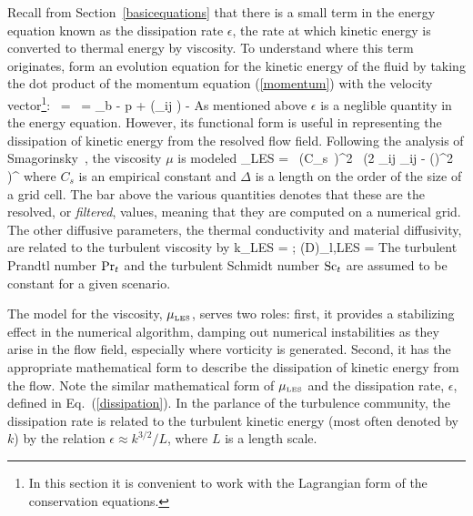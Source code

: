 \documentclass[11pt]{book}
\begin{document}
Recall from Section~\ref{basicequations} that there is a small term in the energy equation
known as the dissipation rate $\epsilon$,
the rate at which kinetic energy is converted to thermal energy by viscosity.
To understand where this term originates, form an evolution equation for the kinetic energy of the fluid by
taking the dot product of the momentum equation (\ref{momentum}) with the velocity vector\footnote{In this section
it is convenient to work with the Lagrangian form of the conservation equations. }:
\be \rho \,  \cdot \bu = \rho  \,  = \rho \bof_b \cdot \bu -
\nabla p \cdot \bu + \nabla \cdot (\btau_{ij} \cdot \bu) - \epsilon \ee
As mentioned above $\epsilon$ is a neglible quantity in the energy equation. However, its functional form
is useful in representing the dissipation of kinetic energy from the resolved flow field.
Following the analysis of Smagorinsky~\cite{Smagorinsky:1}, the viscosity $\mu$ is modeled
\be \mu_{\hbox{\tiny LES}} = \rho \, (C_s\, \Delta)^2 \,
   \left(2 \; \overline{\bS}_{ij} \cdot \overline{\bS}_{ij} -  (\nabla \cdot \overline{\bu})^2 \right)^\ha \ee
where $C_s$ is an empirical constant and $\Delta$ is a length on the
order of the size of a grid cell.
The bar above the various quantities denotes that these are the resolved, or {\em filtered}, values, meaning
that they are computed on a numerical grid.
The other diffusive parameters,
the thermal conductivity and material diffusivity, are related to the turbulent viscosity by
\be k_{\hbox{\tiny LES}} = 
\quad ; \quad
 (\rho D)_{l,\hbox{\tiny LES}} = \ee
The turbulent Prandtl number $\hbox{Pr}_t$ and the turbulent Schmidt number $\hbox{Sc}_t$ are assumed to be
constant for a given scenario.

The model for the viscosity, $\mu_{\hbox{\tiny LES}}$, serves two roles: first, it provides a stabilizing
effect in the numerical
algorithm, damping out numerical instabilities as they arise in the flow field, especially where vorticity is
generated. Second, it has the appropriate mathematical form to describe the dissipation of kinetic energy from the flow.
Note the similar mathematical form of $\mu_{\hbox{\tiny LES}}$ and
the dissipation rate, $\epsilon$, defined in Eq.~(\ref{dissipation}).
In the parlance of the turbulence community, the dissipation
rate is related to the turbulent kinetic energy (most often denoted by $k$) by the
relation $\epsilon \approx k^{3/2}/L$, where $L$ is a length scale.
\end{document}
